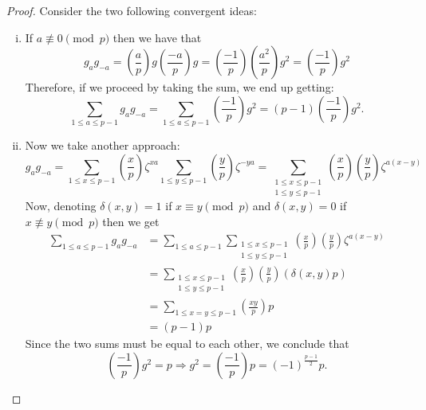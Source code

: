 \begin{proof}
    Consider the two following convergent ideas:
    \begin{enumerate}[i.]
        \item If \(a \not\equiv 0 \pmod{p}\) then we have that
              \[
                  g_{a}g_{-a} = \left( \frac{a}{p} \right) g \left( \frac{-a}{p}
                  \right) g
                  = \left( \frac{-1}{p} \right) \left( \frac{a^2}{p} \right) g^2
                  = \left( \frac{-1}{p} \right)g^2
              \]
              Therefore, if we proceed by taking the sum, we end up getting:
              \[
                  \sum_{1 \leqslant a \leqslant p-1} g_a g_{-a} = \sum_{1 \leqslant a
                      \leqslant p-1} \left( \frac{-1}{p} \right) g^2 = (p-1) \left(
                  \frac{-1}{p} \right) g^2.
              \]
        \item Now we take another approach:
              \[
                  g_a g_{-a} = \sum_{1 \leqslant x \leqslant p-1} \left( \frac{x}{p}
                  \right) \zeta^{xa} \sum_{1 \leqslant y \leqslant p-1} \left(
                  \frac{y}{p} \right) \zeta^{-ya}
                  =
                  \sum_{\substack{1 \leqslant x \leqslant p-1\\ 1 \leqslant y
                          \leqslant p-1}} \left( \frac{x}{p} \right)  \left( \frac{y}{p}
                  \right) \zeta^{a(x-y)}
              \]
              Now, denoting \(\delta(x, y) = 1\) if  \(x \equiv y \pmod{p}\) and
              \(\delta(x,y)= 0\) if  \(x \not\equiv y\pmod{p}\) then we get
              \begin{align*}
                  \sum_{1 \leqslant a \leqslant p-1} g_a g_{-a}
                   & =
                  \sum_{1 \leqslant a \leqslant p-1} \sum_{\substack{1 \leqslant x
                  \leqslant p-1                                                   \\ 1 \leqslant y \leqslant p-1}} \left( \frac{x}{p}
                  \right) \left( \frac{y}{p} \right) \zeta^{a(x-y)}               \\
                   & = \sum_{\substack{1 \leqslant x \leqslant p-1                \\ 1 \leqslant y
                          \leqslant p-1}} \left( \frac{x}{p} \right) \left( \frac{y}{p}
                  \right) (\delta(x, y)p)                                         \\
                   & = \sum_{1 \leqslant x = y \leqslant p-1} \left( \frac{xy}{p}
                  \right) p                                                       \\
                   & = (p-1)p
              \end{align*}
              Since the two sums must be equal to each other, we conclude that
              \[
                  \left( \frac{-1}{p} \right) g^2 = p \Rightarrow g^2 = \left(
                  \frac{-1}{p} \right) p = (-1)^{\frac{p-1}{2}} p.
              \]
    \end{enumerate}
\end{proof}


